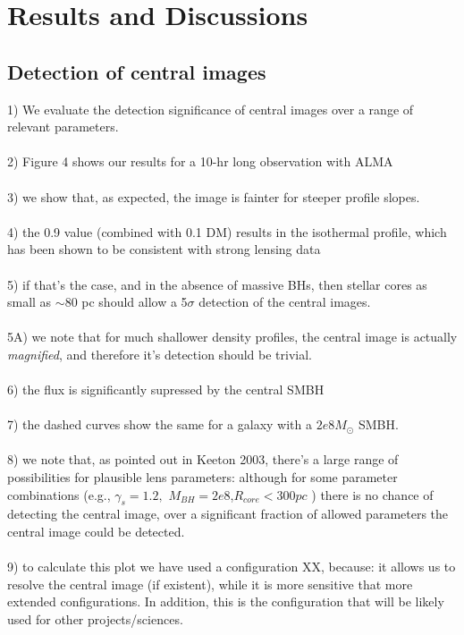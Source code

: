 \documentclass[chicago]{emulateapj}
\begin{document}
\section{Results and Discussions}
\begin{framed}
\subsection{Detection of central images}
1) We evaluate the detection significance of central images over a range of relevant parameters. \\ \\
2) Figure 4 shows our results for a 10-hr long observation with ALMA\\ \\
3) we show that, as expected, the image is fainter for steeper profile slopes. \\ \\
4) the 0.9 value (combined with 0.1 DM) results in the isothermal profile, which has been shown to be consistent with strong lensing data \\ \\
5) if that's the case, and in the absence of massive BHs, then stellar cores as small as $\sim80$ pc should allow a 5$\sigma$ detection of the central images. \\ \\
5A) we note that for much shallower density profiles, the central image is actually \emph{magnified}, and therefore it's detection should be trivial.\\ \\
6) the flux is significantly supressed by the central SMBH \\  \\
7) the dashed curves show the same for a galaxy with a $2e8M_{\odot}$ SMBH. \\ \\
8) we note that, as pointed out in Keeton 2003, there's a large range of possibilities for plausible lens parameters: although for some parameter combinations (e.g., $\gamma_{s}=1.2,$ $M_{BH} = 2e8$,$R_{core}<300 pc$ ) there is no chance of detecting the central image, over a significant fraction of allowed parameters the central image could be detected. \\ \\
9) to calculate this plot we have used a configuration XX, because: it allows us to resolve the central image (if existent), while it is more sensitive that more extended configurations.  In addition, this is the configuration that will be likely used for other projects/sciences.
\end{framed}
\end{document}
